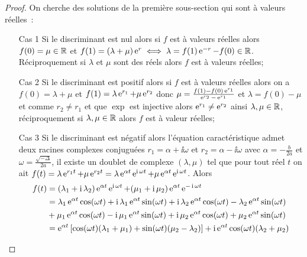 \begin{proof}
  On cherche des solutions de la première sous-section qui sont à valeurs réelles~:
  \begin{enumerate}
    \item[Cas 1]Si le discriminant est nul alors si \(f\) est à valeurs 
      réelles alors \(f(0) = \mu \in \mathbb{R}\) et \(f(1) = (\lambda + \mu)\operatorname{e}^r 
      \iff \lambda = f(1)\operatorname{e}^{-r}-f(0) \in \mathbb{R}\). Réciproquement si 
      \(\lambda\) et \(\mu\) sont des réels alors \(f\) est à valeurs 
      réelles;
    \item[Cas 2]Si le discriminant est positif alors si \(f\) est à valeurs 
      réelles alors on a \(f(0) = \lambda + \mu\) et \(f(1) = \lambda 
      \operatorname{e}^{r_1} + \mu \operatorname{e}^{r_2}\) donc \(\mu = 
      \frac{f(1)-f(0)\operatorname{e}^{r_1}}{\operatorname{e}^{r_2}-\operatorname{e}^{r_1}}\) et \(\lambda = f(0) - 
      \mu\) et comme \(r_2 \neq r_1\) et que \(\exp\) est injective alors 
      \(\operatorname{e}^{r_1} \neq \operatorname{e}^{r_2}\) ainsi \(\lambda, \mu \in \mathbb{R}\), 
      réciproquement si \(\lambda, \mu \in \mathbb{R}\) alors \(f\) est à valeur 
      réelles;
    \item[Cas 3]Si le discriminant est négatif alors l'équation 
      caractéristique admet deux racines complexes conjuguées \(r_1 = 
      \alpha + \ii \omega\) et \(r_2 = \alpha-\ii \omega\) avec \(\alpha = 
      -\frac{b}{2a}\) et \(\omega = \frac{\sqrt{-\Delta}}{2a}\), il existe 
      un doublet de complexe \((\lambda, \mu)\) tel que pour tout réel 
      \(t\) on ait \(f(t) = \lambda \operatorname{e}^{r_1 t} + \mu \operatorname{e}^{r_2 t} = \lambda 
      \operatorname{e}^{\alpha t} \operatorname{e}^{\operatorname{i} \omega t} + \mu \operatorname{e}^{\alpha t} \operatorname{e}^{\operatorname{i} \omega 
      t}\). Alors
      \begin{align}
        f(t)& = (\lambda_1 + \ii \lambda_2) \e^{\alpha t} \e^{\ii \omega 
        t}  + (\mu_1 + \ii \mu_2) \e^{\alpha t} \e^{-\ii \omega t} \\
            &= \lambda_1\e^{\alpha t} \cos(\omega t) + \ii \lambda_1 
            \e^{\alpha t} \sin(\omega t) + \ii \lambda_2 \e^{\alpha t} 
            \cos(\omega t) - \lambda_2 \e^{\alpha t} \sin(\omega t) 
            \notag \\
            &+ \mu_1\e^{\alpha t}\cos(\omega t) -\ii \mu_1 \e^{\alpha t} 
            \sin(\omega t) + \ii\mu_2 \e^{\alpha t} \cos(\omega t) + 
            \mu_2 \e^{\alpha t} \sin(\omega t) \\
            &= \e^{\alpha t} \left[ \cos(\omega t) (\lambda_1 + \mu_1)+ 
            \sin(\omega t)(\mu_2-\lambda_2)\right] + \ii\e^{\alpha t} 
            \cos(\omega t) (\lambda_2 + \mu_2) \notag \\

\end{align}
\end{enumerate}
\end{proof}
